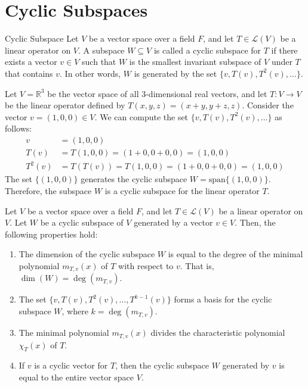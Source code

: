 \documentclass[openany]{book}
\begin{document}
\section{Cyclic Subspaces}
\begin{mydefinition}{Cyclic Subspace}
Let $V$ be a vector space over a field $F$, and let $T \in \mathcal{L}(V)$ be a linear operator on $V$. A subspace $W \subseteq V$ is called a cyclic subspace for $T$ if there exists a vector $v \in V$ such that $W$ is the smallest invariant subspace of $V$ under $T$ that contains $v$. In other words, $W$ is generated by the set $\{v, T(v), T^2(v), \ldots\}$.
\end{mydefinition}
\begin{example}
Let $V = \mathbb{R}^3$ be the vector space of all 3-dimensional real vectors, and let $T: V \to V$ be the linear operator defined by $T(x, y, z) = (x + y, y + z, z)$. Consider the vector $v = (1, 0, 0) \in V$. We can compute the set $\{v, T(v), T^2(v), \ldots\}$ as follows:
\begin{align*}
v &= (1, 0, 0) \\
T(v) &= T(1, 0, 0) = (1 + 0, 0 + 0, 0) = (1, 0, 0) \\
T^2(v) &= T(T(v)) = T(1, 0, 0) = (1 + 0, 0 + 0, 0) = (1, 0, 0)
\end{align*}
The set $\{(1, 0, 0)\}$ generates the cyclic subspace $W = \text{span}\{(1, 0, 0)\}$. Therefore, the subspace $W$ is a cyclic subspace for the linear operator $T$.
\end{example}
\begin{mytheorem}
Let $V$ be a vector space over a field $F$, and let $T \in \mathcal{L}(V)$ be a linear operator on $V$. Let $W$ be a cyclic subspace of $V$ generated by a vector $v \in V$. Then, the following properties hold:
\begin{enumerate}
    \item The dimension of the cyclic subspace $W$ is equal to the degree of the minimal polynomial $m_{T,v}(x)$ of $T$ with respect to $v$. That is, $\dim(W) = \deg(m_{T,v})$.
    \item The set $\{v, T(v), T^2(v), \ldots, T^{k-1}(v)\}$ forms a basis for the cyclic subspace $W$, where $k = \deg(m_{T,v})$.
    \item The minimal polynomial $m_{T,v}(x)$ divides the characteristic polynomial $\chi_T(x)$ of $T$.
    \item If $v$ is a cyclic vector for $T$, then the cyclic subspace $W$ generated by $v$ is equal to the entire vector space $V$.
\end{enumerate}
\end{mytheorem}
\end{document}
